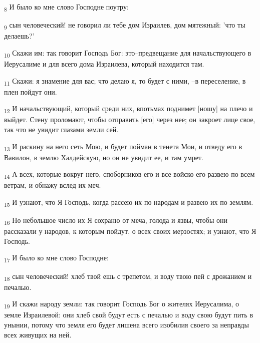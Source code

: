 \begin{tcolorbox}
\textsubscript{8} И было ко мне слово Господне поутру:
\end{tcolorbox}
\begin{tcolorbox}
\textsubscript{9} сын человеческий! не говорил ли тебе дом Израилев, дом мятежный: 'что ты делаешь?'
\end{tcolorbox}
\begin{tcolorbox}
\textsubscript{10} Скажи им: так говорит Господь Бог: это--предвещание для начальствующего в Иерусалиме и для всего дома Израилева, который находится там.
\end{tcolorbox}
\begin{tcolorbox}
\textsubscript{11} Скажи: я знамение для вас; что делаю я, то будет с ними, --в переселение, в плен пойдут они.
\end{tcolorbox}
\begin{tcolorbox}
\textsubscript{12} И начальствующий, который среди них, впотьмах поднимет [ношу] на плечо и выйдет. Стену проломают, чтобы отправить [его] через нее; он закроет лице свое, так что не увидит глазами земли сей.
\end{tcolorbox}
\begin{tcolorbox}
\textsubscript{13} И раскину на него сеть Мою, и будет пойман в тенета Мои, и отведу его в Вавилон, в землю Халдейскую, но он не увидит ее, и там умрет.
\end{tcolorbox}
\begin{tcolorbox}
\textsubscript{14} А всех, которые вокруг него, споборников его и все войско его развею по всем ветрам, и обнажу вслед их меч.
\end{tcolorbox}
\begin{tcolorbox}
\textsubscript{15} И узнают, что Я Господь, когда рассею их по народам и развею их по землям.
\end{tcolorbox}
\begin{tcolorbox}
\textsubscript{16} Но небольшое число их Я сохраню от меча, голода и язвы, чтобы они рассказали у народов, к которым пойдут, о всех своих мерзостях; и узнают, что Я Господь.
\end{tcolorbox}
\begin{tcolorbox}
\textsubscript{17} И было ко мне слово Господне:
\end{tcolorbox}
\begin{tcolorbox}
\textsubscript{18} сын человеческий! хлеб твой ешь с трепетом, и воду твою пей с дрожанием и печалью.
\end{tcolorbox}
\begin{tcolorbox}
\textsubscript{19} И скажи народу земли: так говорит Господь Бог о жителях Иерусалима, о земле Израилевой: они хлеб свой будут есть с печалью и воду свою будут пить в унынии, потому что земля его будет лишена всего изобилия своего за неправды всех живущих на ней.
\end{tcolorbox}
